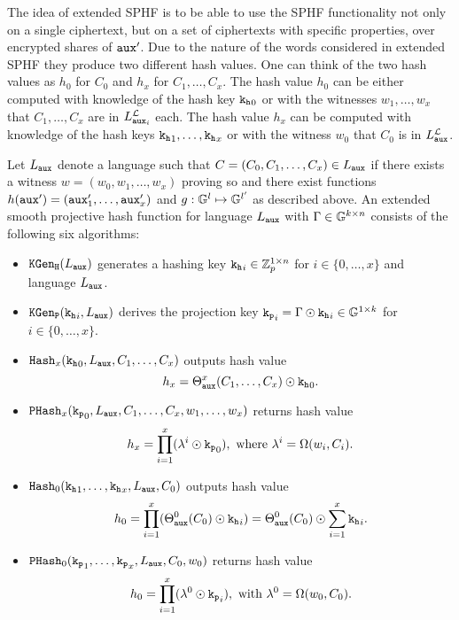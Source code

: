 The idea of extended \ac{SPHF} is to be able to use the \ac{SPHF} functionality not only on a single ciphertext, but on a set of ciphertexts with specific properties, \ie over encrypted shares of $\mathtt{aux}'$.
Due to the nature of the words considered in extended \ac{SPHF} they produce two different hash values.
One can think of the two hash values as $h_0$ for $C_0$ and  $h_x$ for $C_1,\dots,C_x$.
The hash value $h_0$ can be either computed with knowledge of the hash key $\mathtt{k_h}_0$ or with the witnesses $w_1,\dots,w_x$ that $C_1,\dots,C_x$ are in $L^\mathcal{L}_{\mathtt{aux}_i}$ each.
The hash value $h_x$ can be computed with knowledge of the hash keys $\mathtt{k_h}_1,\dots,\mathtt{k_h}_x$ or with the witness $w_0$ that $C_0$ is in $L^\mathcal{L}_{\mathtt{aux}}$.

\begin{definition}\label{def:symgensphf}
Let $L_\mathtt{aux}$ denote a language such that $C=(C_0,C_1,\dots,\allowbreak C_x)\in L_\mathtt{aux}$ if there exists a witness $w=(w_0,w_1,\dots,w_x)$ proving so and there exist functions $h(\mathtt{aux}')=(\mathtt{aux}'_1,\dots,\mathtt{aux}'_x)$ and $g:\mathbb{G}^l\mapsto\mathbb{G}^{l'}$ as described above.
An extended smooth projective hash function for language $L_\mathtt{aux}$ with $\Gamma\in\mathbb{G}^{k\times n}$ consists of the following six algorithms:

\begin{itemize}
	\item $\mathtt{KGen_H}(L_\mathtt{aux})$ generates a hashing key $\mathtt{k_h}_i\in\mathbb{Z}_p^{1\times n}$ for $i\in\{0,\dots,x\}$ and language $L_\mathtt{aux}$.
	
	\item $\mathtt{KGen_P}(\mathtt{k_h}_i,L_\mathtt{aux})$ derives the projection key $\mathtt{k_p}_i=\Gamma \odot \mathtt{k_h}_i\in\mathbb{G}^{1\times k}$ for $i\in\{0,\dots,x\}$.
	
	\item $\mathtt{Hash}_x(\mathtt{k_h}_0,L_\mathtt{aux},C_1,\dots,C_x)$ outputs hash value
	\[h_x=\Theta^x_{\mathtt{aux}}(C_1,\dots,C_x)\odot\mathtt{k_h}_0.\]
	
	\item $\mathtt{PHash}_x(\mathtt{k_p}_0,L_\mathtt{aux},C_1,\dots,C_x,w_1,\dots,w_x)$ returns hash value
	\[h_x=\prod^{x}_{i=1}(\lambda^i\odot \mathtt{k_p}_0), \text{ where } \lambda^i=\Omega(w_i,C_i).\]
	
	\item $\mathtt{Hash}_0(\mathtt{k_h}_1,\dots,\mathtt{k_h}_x,L_\mathtt{aux},C_0)$ outputs hash value
	\[h_0=\prod^{x}_{i=1}(\Theta_{\mathtt{aux}}^0(C_0)\odot\mathtt{k_h}_i)=\Theta_{\mathtt{aux}}^0(C_0)\odot \sum^x_{i=1}\mathtt{k_h}_i.\]
	
	\item $\mathtt{PHash}_0(\mathtt{k_p}_1,\dots,\mathtt{k_p}_x,L_\mathtt{aux},C_0,w_0)$ returns hash value
	\[h_0=\prod^{x}_{i=1}(\lambda^0\odot \mathtt{k_p}_i), \text{ with } \lambda^0=\Omega(w_0,C_0).\] \eod
\end{itemize}
\end{definition}

